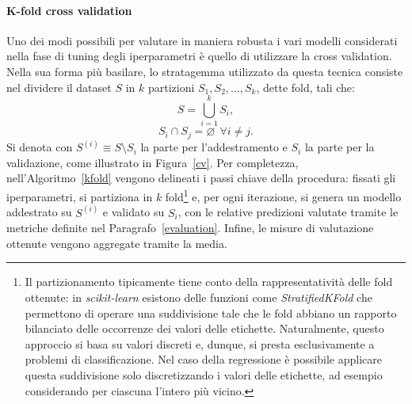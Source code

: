 \documentclass[12pt]{report}
\theoremstyle{definition}
\let\emptyset\varnothing
\begin{document}
\paragraph{K-fold cross validation}
Uno dei modi possibili per valutare in maniera robusta i vari modelli considerati nella fase di tuning degli iperparametri è quello di utilizzare la cross validation. 
Nella sua forma più basilare, lo stratagemma utilizzato da questa tecnica consiste nel dividere il dataset $S$ in $k$ partizioni $S_1, S_2, ..., S_k$, dette fold, tali che:
\begin{equation}
     S = \bigcup\limits_{i=1}^{k} S_{i},
\end{equation}
\begin{equation}
    S_i \cap S_j = \emptyset \ \ \forall i \neq j.
\end{equation}
Si denota con $S^{(i)} \equiv S \setminus S_i$ la parte per l'addestramento e $S_i$ la parte per la validazione, come illustrato in Figura~\ref{cv}.
Per completezza, nell'Algoritmo~\ref{kfold} vengono delineati i passi chiave della procedura: fissati gli iperparametri, si partiziona in $k$ fold\footnote{Il partizionamento tipicamente tiene conto della rappresentatività delle fold ottenute: in \textit{scikit-learn} esistono delle funzioni come \textit{StratifiedKFold} che permettono di operare una suddivisione tale che le fold abbiano un rapporto bilanciato delle occorrenze dei valori delle etichette. Naturalmente, questo approccio si basa su valori discreti e, dunque, si presta esclusivamente a problemi di classificazione. Nel caso della regressione è possibile applicare questa suddivisione solo discretizzando i valori delle etichette, ad esempio considerando per ciascuna l'intero più vicino.} e, per ogni iterazione, si genera un modello addestrato su $S^{(i)}$ e validato su $S_i$, con le relative predizioni valutate tramite le metriche definite nel Paragrafo~\ref{evaluation}. Infine, le misure di valutazione ottenute vengono aggregate tramite la media.
\end{document}
